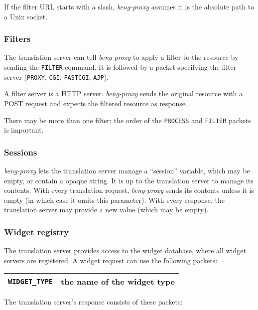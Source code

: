 \documentclass[a4paper,12pt]{article}
\begin{document}
If the filter URL starts with a slash, \emph{beng-proxy} assumes it is
the absolute path to a Unix socket.

\subsubsection{Filters}
\label{filter}

The translation server can tell \emph{beng-proxy} to apply a filter to
the resource by sending the \texttt{FILTER} command.  It is followed
by a packet specifying the filter server (\texttt{PROXY},
\texttt{CGI}, \texttt{FASTCGI}, \texttt{AJP}).

A filter server is a HTTP server.  \emph{beng-proxy} sends the
original resource with a POST request and expects the filtered
resource as response.

There may be more than one filter; the order of the \texttt{PROCESS}
and \texttt{FILTER} packets is important.

\subsubsection{Sessions}
\label{sessions}

\emph{beng-proxy} lets the translation server manage a ``session''
variable, which may be empty, or contain a opaque string.  It is up to
the translation server to manage its contents.  With every translation
request, \emph{beng-proxy} sends its contents unless it is empty (in
which case it omits this parameter).  With every response, the
translation server may provide a new value (which may be empty).

\subsubsection{Widget registry}

The translation server provides access to the widget database, where
all widget servers are registered.  A widget request can use the
following packets:

\begin{tabular}{|l|p{10cm}|}
\hline
\texttt{WIDGET\_TYPE} & the name of the widget type \\
\hline
\end{tabular}

The translation server's response consists of these packets:
\end{document}
